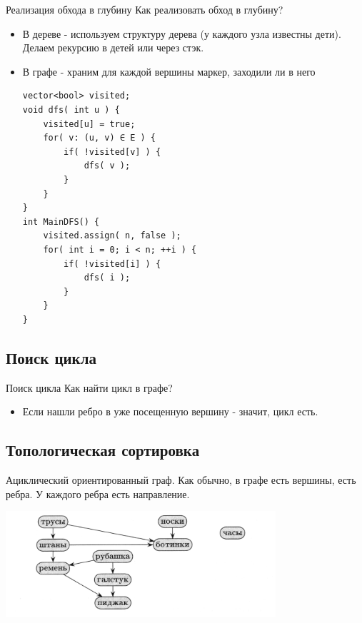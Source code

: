 \documentclass[10pt]{beamer}
\begin{document}
\begin{frame}[fragile]{Реализация обхода в глубину}
Как реализовать обход в глубину?
    \begin{itemize}
        \item В дереве - используем структуру дерева (у каждого узла известны дети). Делаем рекурсию в детей или через стэк.
        \item В графе - храним для каждой вершины маркер, заходили ли в него
\begin{lstlisting}
vector<bool> visited;
void dfs( int u ) {
    visited[u] = true;
    for( v: (u, v) ∈ E ) {
        if( !visited[v] ) {
            dfs( v );
        }
    }
}
int MainDFS() {
    visited.assign( n, false );
    for( int i = 0; i < n; ++i ) {
        if( !visited[i] ) {
            dfs( i );
        }
    }
}
\end{lstlisting}
    \end{itemize}
\end{frame}


\subsection{Поиск цикла}

\begin{frame}[fragile]{Поиск цикла}
Как найти цикл в графе?
    \begin{itemize}
        \item Если нашли ребро в уже посещенную вершину - значит, цикл есть.

    \end{itemize}
\end{frame}

\subsection{Топологическая сортировка}

\begin{frame}[fragile]{Ациклический ориентированный граф.}
Как обычно, в графе есть вершины, есть ребра. У каждого ребра есть направление.
\begin{center}
    \includegraphics[width=10cm]{Term_2/Source/images/3_topological-sort-1.png}
\end{center}
\end{frame}
\end{document}
